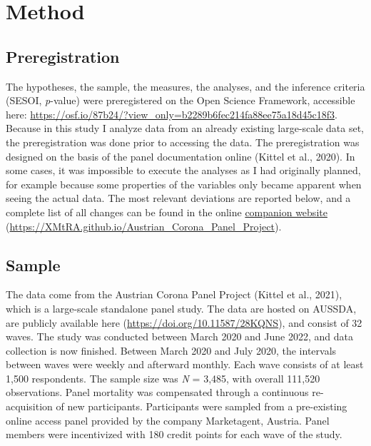 \documentclass[
  man,floatsintext]{apa7}
\begin{document}
\hypertarget{method}{%
\section{Method}\label{method}}

\hypertarget{preregistration}{%
\subsection{Preregistration}\label{preregistration}}

The hypotheses, the sample, the measures, the analyses, and the inference criteria (SESOI, \emph{p}-value) were preregistered on the Open Science Framework, accessible here: \url{https://osf.io/87b24/?view_only=b2289b6fec214fa88ee75a18d45c18f3}.
Because in this study I analyze data from an already existing large-scale data set, the preregistration was done prior to accessing the data.
The preregistration was designed on the basis of the panel documentation online (Kittel et al., 2020).
In some cases, it was impossible to execute the analyses as I had originally planned, for example because some properties of the variables only became apparent when seeing the actual data.
The most relevant deviations are reported below, and a complete list of all changes can be found in the online \href{https://XMtRA.github.io/Austrian_Corona_Panel_Project}{companion website} (\url{https://XMtRA.github.io/Austrian_Corona_Panel_Project}).

\hypertarget{sample}{%
\subsection{Sample}\label{sample}}

The data come from the Austrian Corona Panel Project (Kittel et al., 2021), which is a large-scale standalone panel study.
The data are hosted on AUSSDA, are publicly available here (\url{https://doi.org/10.11587/28KQNS}), and consist of 32 waves.
The study was conducted between March 2020 and June 2022, and data collection is now finished.
Between March 2020 and July 2020, the intervals between waves were weekly and afterward monthly.
Each wave consists of at least 1,500 respondents.
The sample size was \emph{N} = 3,485, with overall 111,520 observations.
Panel mortality was compensated through a continuous re-acquisition of new participants.
Participants were sampled from a pre-existing online access panel provided by the company Marketagent, Austria.
Panel members were incentivized with 180 credit points for each wave of the study.
\end{document}
